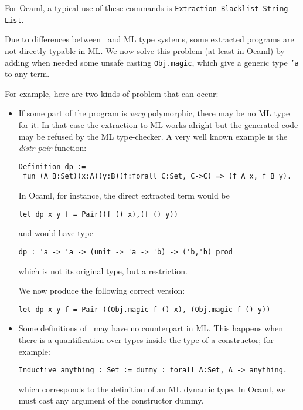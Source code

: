\noindent For Ocaml, a typical use of these commands is
{\tt Extraction Blacklist String List}.



Due to differences between \Coq\ and ML type systems, 
some extracted programs are not directly typable in ML. 
We now solve this problem (at least in Ocaml) by adding 
when needed some unsafe casting {\tt Obj.magic}, which give
a generic type {\tt 'a} to any term.

For example, here are two kinds of problem that can occur:

\begin{itemize}
  \item If some part of the program is {\em very} polymorphic, there
    may be no ML type for it. In that case the extraction to ML works
    alright but the generated code may be refused by the ML
    type-checker. A very well known example is the {\em distr-pair}
    function:
\begin{verbatim}
Definition dp := 
 fun (A B:Set)(x:A)(y:B)(f:forall C:Set, C->C) => (f A x, f B y).
\end{verbatim}

In Ocaml, for instance, the direct extracted term would be
\begin{verbatim}
let dp x y f = Pair((f () x),(f () y))
\end{verbatim}

and would have type
\begin{verbatim}
dp : 'a -> 'a -> (unit -> 'a -> 'b) -> ('b,'b) prod
\end{verbatim}

which is not its original type, but a restriction.

We now produce the following correct version:
\begin{verbatim}
let dp x y f = Pair ((Obj.magic f () x), (Obj.magic f () y))
\end{verbatim}

  \item Some definitions of \Coq\ may have no counterpart in ML. This
    happens when there is a quantification over types inside the type
    of a constructor; for example:
\begin{verbatim}
Inductive anything : Set := dummy : forall A:Set, A -> anything.
\end{verbatim}

which corresponds to the definition of an ML dynamic type.
In Ocaml, we must cast any argument of the constructor dummy.

\end{itemize}

